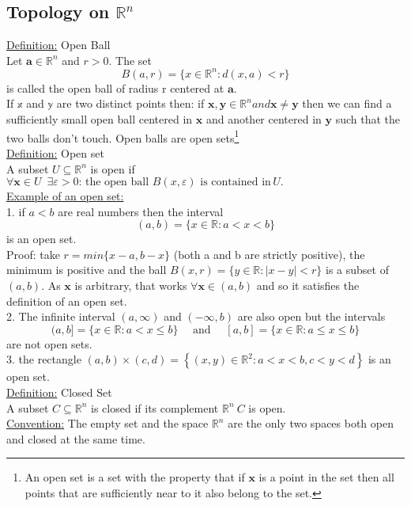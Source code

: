 \documentclass[a4paper,11pt]{article}
\newcommand{\abs}[1]{
  \left\lvert {#1} \right\rvert
}
\begin{document}
\subsection{Topology on $\mathbb{R}^n$}
\underline{Definition:} Open Ball \\
Let $\mathbf{a} \in \mathbb{R}^n$ and $r > 0$. The set 
$$B(a,r) = \{ x \in \mathbb{R}^n : d(x,a) < r \} $$
is called the open ball of radius r centered at  $ \mathbf{a} $.\\
If $\mathbb{x}$ and $\mathbb{y}$ are two distinct points then: if $\mathbf{x,y} \in \mathbb{R}^n and \mathbf{x \neq y} $ then we can find a sufficiently small open ball centered in $\mathbf{x}$ and another centered in $\mathbf{y} $ such that the two balls don't touch.
Open balls are open sets\footnote{An open set is a set with the property that if $\mathbf{x}$ is a point in the set then all points that are sufficiently near to it also belong to the set. } \\
\underline{Definition:} Open set \\
A subset $U \subseteq \mathbb{R}^n $ is open if $\forall \mathbf{x} \in U  \, \, \, \exists \varepsilon > 0 : \, \text{the open ball} \, \, B(x,\varepsilon) \, \, \text{is contained in} \, U. $  \\
\underline{Example of an open set:}\\
1. if $a < b$ are real numbers then the interval $$ (a,b) = \{x \in \mathbb{R} : a < x < b\} $$
is an open set. \\
Proof: take $r = min\{x-a, b-x\}$ (both a and b are strictly positive), the minimum is positive and the ball $B(x,r) = \{y\in\mathbb{R} : \abs{x-y} < r\}$ is a subset of $(a,b)$.
As $\mathbf{x}$ is arbitrary, that works $\forall \mathbf{x} \in (a,b)$ and so it satisfies the definition of an open set. \\
2. The infinite interval $(a,\infty)$ and $(-\infty,b)$ are also open but the intervals 
$$ (a, b]=\{x \in \mathbb{R}: a<x \leqslant b\} \quad \text { and } \quad[a, b]=\{x \in \mathbb{R}: a \leqslant x \leqslant b\} $$
are not open sets. \\
3. the rectangle $(a, b) \times(c, d)=\left\{(x, y) \in \mathbb{R}^2: a<x<b, c<y<d\right\}$ is an open set. \\
\underline{Definition:} Closed Set \\
A subset $C \subseteq \mathbb{R}^n$ is closed if its complement $\mathbb{R}^n \ C $ is open. \\
\underline{Convention:} The empty set and the space $\mathbb{R}^n $ are the only two spaces both open and closed at the same time. \\
\end{document}
